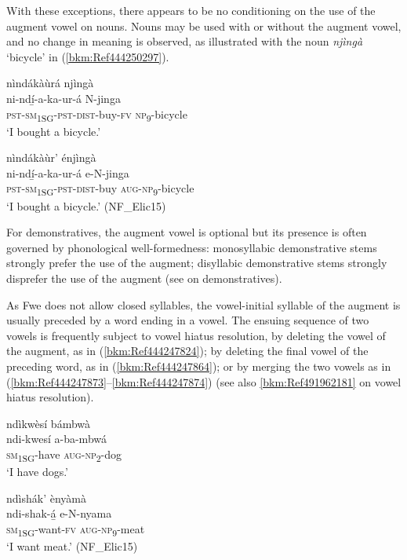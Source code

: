 With these exceptions, there appears to be no conditioning on the use of the augment vowel on nouns. Nouns may be used with or without the augment vowel, and no change in meaning is observed, as illustrated with the noun \textit{njìngà} ‘bicycle’ in (\ref{bkm:Ref444250297}).

\ea
\label{bkm:Ref444250297}
\ea
nìndákàùrá njìngà\\
\gll ni-ndí̲-a-ka-ur-á      N-jinga\\
\textsc{pst}-\textsc{sm}\textsubscript{1SG}-\textsc{pst}-\textsc{dist}-buy-\textsc{fv}  \textsc{np}\textsubscript{9}-bicycle\\
\glt ‘I bought a bicycle.’

\ex
nìndákàùr’ énjìngà\\
\gll ni-ndí̲-a-ka-ur-á    e-N-jinga\\
\textsc{pst}-\textsc{sm}\textsubscript{1SG}-\textsc{pst}-\textsc{dist}-buy  \textsc{aug}-\textsc{np}\textsubscript{9}-bicycle\\
\glt ‘I bought a bicycle.’ (NF\_Elic15)
\z\z

For demonstratives, the augment vowel is optional but its presence is often governed by phonological well-formedness: monosyllabic demonstrative stems strongly prefer the use of the augment; disyllabic demonstrative stems strongly disprefer the use of the augment (see  on demonstratives).

As Fwe does not allow closed syllables, the vowel-initial syllable of the augment is usually preceded by a word ending in a vowel. The ensuing sequence of two vowels is frequently subject to vowel hiatus resolution, by deleting the vowel of the augment, as in (\ref{bkm:Ref444247824}); by deleting the final vowel of the preceding word, as in (\ref{bkm:Ref444247864}); or by merging the two vowels as in (\ref{bkm:Ref444247873}--\ref{bkm:Ref444247874}) (see also \ref{bkm:Ref491962181} on vowel hiatus resolution).

\ea
\label{bkm:Ref444247824}
ndìkwèsí bámbwà\\
\gll ndi-kwesí  a-ba-mbwá\\
\textsc{sm}\textsubscript{1SG}-have  \textsc{aug}-\textsc{np}\textsubscript{2}-dog\\
\glt ‘I have dogs.’
\z

\ea
\label{bkm:Ref444247864}
ndìshák’ ènyàmà\\
\gll ndi-shak-á̲    e-N-nyama\\
\textsc{sm}\textsubscript{1SG}-want-\textsc{fv}  \textsc{aug}-\textsc{np}\textsubscript{9}-meat\\
\glt ‘I want meat.’ (NF\_Elic15)
\z

